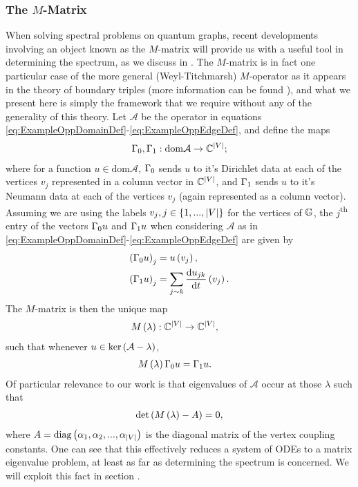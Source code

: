 \subsubsection{The $M$-Matrix} \label{sssec:MMatrix}
When solving spectral problems on quantum graphs, recent developments involving an object known as the $M$-matrix will provide us with a useful tool in determining the spectrum, as we discuss in .
The $M$-matrix is in fact one particular case of the more general (Weyl-Titchmarsh) $M$-operator as it appears in the theory of boundary triples (more information can be found ), and what we present here is simply the framework that we require without any of the generality of this theory.
Let $\mathcal{A}$ be the operator in equations \eqref{eq:ExampleOppDomainDef}-\eqref{eq:ExampleOppEdgeDef}, and define the maps
\begin{align*}
	\Gamma_0, \Gamma_1: \mathrm{dom}\mathcal{A} \rightarrow \mathbb{C}^{\left\lvert V \right\rvert};
\end{align*}
where for a function $u\in\mathrm{dom}\mathcal{A}$, $\Gamma_0$ sends $u$ to it's Dirichlet data at each of the vertices $v_j$ represented in a column vector in $\mathbb{C}^{\left\lvert V \right\rvert}$, and $\Gamma_1$ sends $u$ to it's Neumann data at each of the vertices $v_j$ (again represented as a column vector).
Assuming we are using the labels $v_j, j\in\left\{ 1,...,\left\lvert V \right\rvert \right\}$ for the vertices of $\mathbb{G}$, the $j$\textsuperscript{th} entry of the vectors $\Gamma_0 u$ and $\Gamma_1 u$ when considering $\mathcal{A}$ as in \eqref{eq:ExampleOppDomainDef}-\eqref{eq:ExampleOppEdgeDef} are given by
\begin{align*}
	\left( \Gamma_0 u \right)_j &= u\left( v_j \right), \\
	\left( \Gamma_1 u \right)_j &= \sum_{j\sim k}\dfrac{\mathrm{d}u_{jk}}{\mathrm{d}t}\left( v_j \right).
\end{align*}
The $M$-matrix is then the unique map
\begin{align*}
	M\left( \lambda \right):\mathbb{C}^{\left\lvert V \right\rvert} &\rightarrow \mathbb{C}^{\left\lvert V \right\rvert},
\end{align*}
such that whenever $u\in\mathrm{ker}\left( \mathcal{A}-\lambda \right)$,
\begin{align*}
	M\left( \lambda \right)\Gamma_0 u &= \Gamma_1 u.
\end{align*}
Of particular relevance to our work is that eigenvalues of $\mathcal{A}$ occur at those $\lambda$ such that 
\begin{align*}
	\mathrm{det}\left( M\left( \lambda \right) - A \right)= 0,
\end{align*}
where $A = \mathrm{diag}\left( \alpha_1, \alpha_2, ... , \alpha_{\left\lvert V \right\rvert} \right)$ is the diagonal matrix of the vertex coupling constants.
One can see that this effectively reduces a system of ODEs to a matrix eigenvalue problem, at least as far as determining the spectrum is concerned.
We will exploit this fact in section .


